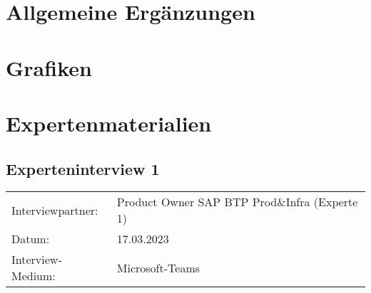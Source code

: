 \section{Allgemeine Ergänzungen}
\newpage
\section{Grafiken}
\newpage
\section{Expertenmaterialien}
\newpage

\subsection{Experteninterview 1}
	\begin{tabular}{ l l }
		Interviewpartner: & Product Owner SAP BTP Prod\&Infra (Experte 1)\\
		Datum: & 17.03.2023\\
		Interview-Medium: & Microsoft-Teams\\
\end{tabular}\\\\

